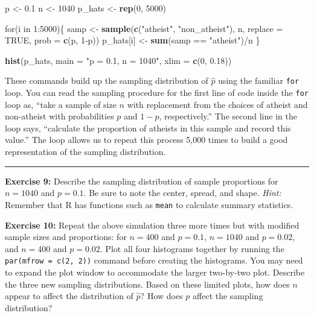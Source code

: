 \documentclass[]{book}
\newenvironment{Shaded}{\begin{snugshade}}{\end{snugshade}}
\newcommand{\KeywordTok}[1]{\textcolor[rgb]{0.13,0.29,0.53}{\textbf{{#1}}}}
\newcommand{\DataTypeTok}[1]{\textcolor[rgb]{0.13,0.29,0.53}{{#1}}}
\newcommand{\DecValTok}[1]{\textcolor[rgb]{0.00,0.00,0.81}{{#1}}}
\newcommand{\FloatTok}[1]{\textcolor[rgb]{0.00,0.00,0.81}{{#1}}}
\newcommand{\StringTok}[1]{\textcolor[rgb]{0.31,0.60,0.02}{{#1}}}
\newcommand{\OtherTok}[1]{\textcolor[rgb]{0.56,0.35,0.01}{{#1}}}
\newcommand{\NormalTok}[1]{{#1}}
\theoremstyle{definition}
\theoremstyle{definition}
\theoremstyle{definition}
\theoremstyle{remark}
\begin{document}
\begin{Shaded}
\begin{Highlighting}[]
\NormalTok{p <-}\StringTok{ }\FloatTok{0.1}
\NormalTok{n <-}\StringTok{ }\DecValTok{1040}
\NormalTok{p_hats <-}\StringTok{ }\KeywordTok{rep}\NormalTok{(}\DecValTok{0}\NormalTok{, }\DecValTok{5000}\NormalTok{)}

\NormalTok{for(i in }\DecValTok{1}\NormalTok{:}\DecValTok{5000}\NormalTok{)\{}
  \NormalTok{samp <-}\StringTok{ }\KeywordTok{sample}\NormalTok{(}\KeywordTok{c}\NormalTok{(}\StringTok{"atheist"}\NormalTok{, }\StringTok{"non_atheist"}\NormalTok{), n, }\DataTypeTok{replace =} \OtherTok{TRUE}\NormalTok{, }\DataTypeTok{prob =} \KeywordTok{c}\NormalTok{(p, }\DecValTok{1}\NormalTok{-p))}
  \NormalTok{p_hats[i] <-}\StringTok{ }\KeywordTok{sum}\NormalTok{(samp ==}\StringTok{ "atheist"}\NormalTok{)/n}
\NormalTok{\}}

\KeywordTok{hist}\NormalTok{(p_hats, }\DataTypeTok{main =} \StringTok{"p = 0.1, n = 1040"}\NormalTok{, }\DataTypeTok{xlim =} \KeywordTok{c}\NormalTok{(}\DecValTok{0}\NormalTok{, }\FloatTok{0.18}\NormalTok{))}
\end{Highlighting}
\end{Shaded}

These commands build up the sampling distribution of \(\hat{p}\) using
the familiar \texttt{for} loop. You can read the sampling procedure for
the first line of code inside the \texttt{for} loop as, ``take a sample
of size \(n\) with replacement from the choices of atheist and
non-atheist with probabilities \(p\) and \(1 - p\), respectively.'' The
second line in the loop says, ``calculate the proportion of atheists in
this sample and record this value.'' The loop allows us to repeat this
process 5,000 times to build a good representation of the sampling
distribution.

\begin{center}\rule{0.5\linewidth}{\linethickness}\end{center}

\textbf{Exercise 9:} Describe the sampling distribution of sample
proportions for \(n = 1040\) and \(p = 0.1\). Be sure to note the
center, spread, and shape. \emph{Hint:} Remember that R has functions
such as \texttt{mean} to calculate summary statistics.

\textbf{Exercise 10:} Repeat the above simulation three more times but
with modified sample sizes and proportions: for \(n = 400\) and
\(p = 0.1\), \(n = 1040\) and \(p = 0.02\), and \(n = 400\) and
\(p = 0.02\). Plot all four histograms together by running the
\texttt{par(mfrow\ =\ c(2,\ 2))} command before creating the histograms.
You may need to expand the plot window to accommodate the larger
two-by-two plot. Describe the three new sampling distributions. Based on
these limited plots, how does \(n\) appear to affect the distribution of
\(\hat{p}\)? How does \(p\) affect the sampling distribution?
\end{document}
